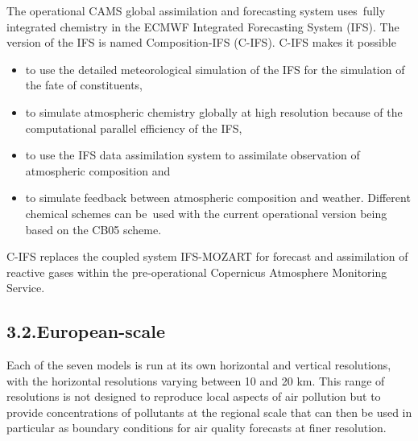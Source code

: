 \documentclass[9pt]{report}
\begin{document}
\noindent{}The operational CAMS global assimilation and forecasting system uses fully integrated chemistry in the ECMWF Integrated Forecasting System (IFS). The version of the IFS is named Composition-IFS (C-IFS). 
C-IFS makes it possible %

\begin{itemize}%

\item{}
to use the detailed meteorological simulation of the IFS for the simulation of the fate of constituents, %

\item{}
to simulate atmospheric chemistry globally at high resolution because of the computational parallel efficiency of the IFS, %

\item{}
to use the IFS data assimilation system to assimilate observation of atmospheric composition and %

\item{}
to simulate feedback between atmospheric composition and weather. Different chemical schemes can be used with the current operational version being based on the CB05 scheme.%
\end{itemize}%

\noindent{}C-IFS  replaces the coupled system IFS-MOZART for forecast and assimilation of reactive gases within the pre-operational Copernicus Atmosphere Monitoring Service.%

\subsection{3.2.\hspace*{0.5em}European-scale}\label{sec-european-scale}%

\noindent{}Each of the seven models is run at its own horizontal and vertical resolutions, with the horizontal resolutions varying between 10 and 20 km. 
This range of resolutions is not designed to reproduce local aspects of air pollution but to provide concentrations of pollutants at the regional scale that can then be used in particular as boundary conditions for air quality forecasts at finer resolution.%
\end{document}
